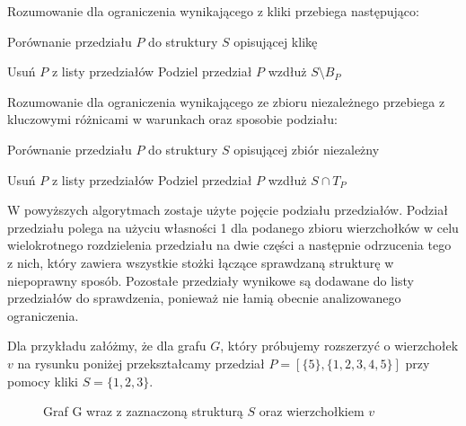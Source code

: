 Rozumowanie dla ograniczenia wynikającego z kliki przebiega następująco:
\begin{algorithm}[H]
  \caption{Porównanie przedziału $P$ do struktury $S$ opisującej klikę}
  \begin{algorithmic}
	  \STATE Usuń $P$ z listy przedziałów
	\ELSE
	  \STATE Podziel przedział $P$ wzdłuż $S \setminus B_P  $
  	\ENDIF
  \ENDIF  
  \end{algorithmic}
\end{algorithm}

Rozumowanie dla ograniczenia wynikającego ze zbioru niezależnego przebiega z kluczowymi różnicami w warunkach oraz sposobie podziału:

\begin{algorithm}[H]
  \caption{Porównanie przedziału $P$ do struktury $S$ opisującej zbiór niezależny}
  \begin{algorithmic}
	  \STATE Usuń $P$ z listy przedziałów
	\ELSE
	  \STATE Podziel przedział $P$ wzdłuż $S \cap T_P  $
  	\ENDIF
  \ENDIF  
  \end{algorithmic}
\end{algorithm}

W powyższych algorytmach zostaje użyte pojęcie podziału przedziałów. Podział przedziału polega na  użyciu własności 1 dla podanego zbioru wierzchołków w celu wielokrotnego rozdzielenia przedziału na dwie części a następnie odrzucenia tego z nich, który zawiera wszystkie stożki łączące sprawdzaną strukturę w niepoprawny sposób. Pozostałe przedziały wynikowe są dodawane do listy przedziałów do sprawdzenia, ponieważ nie łamią obecnie analizowanego ograniczenia. 

Dla przykładu załóżmy, że dla grafu $G$, który próbujemy rozszerzyć o wierzchołek $v$ na rysunku poniżej przekształcamy przedział $P =[\{5\},\{1,2,3,4,5\}]$ przy pomocy kliki $S = \{1,2,3\}$.
\begin{figure}[H]
  \centering
    \caption{Graf G wraz z zaznaczoną strukturą $S$ oraz wierzchołkiem $v$}
 \end{figure}
 

